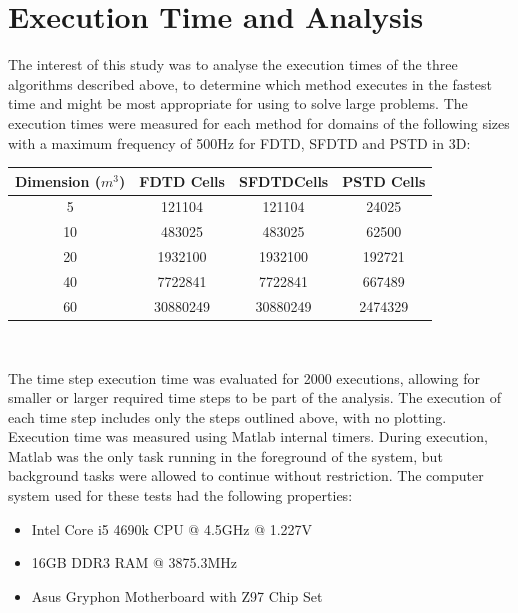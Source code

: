 %
%
%
\chapter{Execution Time and Analysis}
\label{Introduction}
The interest of this study was to analyse the execution times of the three algorithms described above, to determine which method executes in the fastest time and might be most appropriate for using to solve large problems. The execution times were measured for each method for domains of the following sizes with a maximum frequency of 500Hz for FDTD, SFDTD and PSTD in 3D:\\
\begin{center}
\begin{tabular}{|c|c|c|c|} 
  \hline
 Dimension ($m^3$) & FDTD Cells & SFDTDCells & PSTD Cells \\
 \hline
 5 & 121104	& 121104 & 24025\\ 
 10 & 483025 & 483025 & 62500\\  
 20 & 1932100 & 1932100 & 192721\\ 
 40 & 7722841 & 7722841 & 667489\\ 
 60 & 30880249 & 30880249 & 2474329\\ 
 \hline
\end{tabular}\\
\end{center}

The time step execution time was evaluated for 2000 executions, allowing for smaller or larger required time steps to be part of the analysis. The execution of each time step includes only the steps outlined above, with no plotting. Execution time was measured using Matlab internal timers. During execution, Matlab was the only task running in the foreground of the system, but background tasks were allowed to continue without restriction. The computer system used for these tests had the following properties:\\

\begin{itemize}
\item Intel Core i5 4690k CPU @ 4.5GHz @ 1.227V
\item 16GB DDR3 RAM @ 3875.3MHz
\item Asus Gryphon Motherboard with Z97 Chip Set
\end{itemize}

